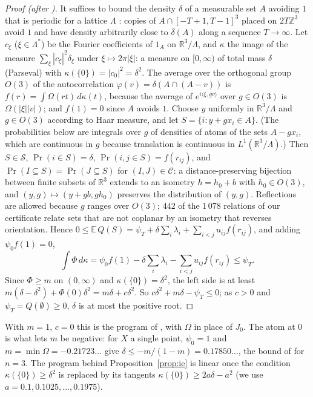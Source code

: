 \documentclass[11pt,a4paper]{amsart}
\theoremstyle{remark}
\newcommand{\R}{\mathbb{R}}
\newcommand{\Z}{\mathbb{Z}}
\newcommand{\E}{\mathbb{E}}
\newcommand{\NCONG}{1\,078}
\newcommand{\NREV}{442}
\begin{document}
\begin{proof}[Proof (after \cite{ACMVZ})]
It suffices to bound the density $\delta$ of a measurable set $A$ avoiding $1$ that is periodic for a lattice
$\Lambda$ \cite[§2]{OFV}: copies of $A\cap[-T+1,T-1]^3$ placed on $2T\Z^3$ avoid $1$ and have density arbitrarily close
to $\overline\delta(A)$ along a sequence $T\to\infty$. Let $c_\xi$ ($\xi\in\Lambda^*$) be the Fourier coefficients of
$1_A$ on $\R^3/\Lambda$, and $\kappa$ the image of the measure $\sum_\xi|c_\xi|^2\delta_\xi$ under $\xi\mapsto2\pi|\xi|$: a
measure on $[0,\infty)$ of total mass $\delta$ (Parseval) with $\kappa(\{0\})=|c_0|^2=\delta^2$. The average over the
orthogonal group $O(3)$ of the autocorrelation $\varphi(v)=\delta(A\cap(A-v))$ is
$f(r)=\int\Omega(rt)\,d\kappa(t)$, because the average of $e^{i\langle\xi,gv\rangle}$ over $g\in O(3)$ is
$\Omega(|\xi||v|)$; and $f(1)=0$ since $A$ avoids $1$. Choose $y$ uniformly in $\R^3/\Lambda$ and $g\in O(3)$ according
to Haar measure, and let $S=\{i:y+gx_i\in A\}$. (The probabilities below are integrals over $g$ of densities of atoms
of the sets $A-gx_i$, which are continuous in $g$ because translation is continuous in $L^1(\R^3/\Lambda)$.) Then
$S\in\mathcal S$, $\Pr(i\in S)=\delta$, $\Pr(i,j\in S)=f(r_{ij})$, and $\Pr(I\subseteq S)=\Pr(J\subseteq S)$ for
$(I,J)\in\mathcal C$: a distance-preserving bijection between finite subsets of $\R^3$ extends to an isometry $h=h_0+b$
with $h_0\in O(3)$, and $(y,g)\mapsto(y+gb,gh_0)$ preserves the distribution of $(y,g)$. Reflections are allowed
because $g$ ranges over $O(3)$; $\NREV$ of the $\NCONG$ relations of our certificate relate sets that are not
coplanar by an isometry that reverses orientation. Hence $0\le\E\,Q(S)=\psi_T+\delta\sum_i\lambda_i+\sum_{i<j}u_{ij}f(r_{ij})$,
and adding $\psi_0f(1)=0$,
\[
\int\Phi\,d\kappa=\psi_0f(1)-\delta\sum_i\lambda_i-\sum_{i<j}u_{ij}f(r_{ij})\le\psi_T.
\]
Since $\Phi\ge m$ on $(0,\infty)$ and $\kappa(\{0\})=\delta^2$, the left side is at least
$m(\delta-\delta^2)+\Phi(0)\delta^2=m\delta+c\delta^2$. So $c\delta^2+m\delta-\psi_T\le0$; as $c>0$ and
$\psi_T=Q(\emptyset)\ge0$, $\delta$ is at most the positive root.
\end{proof}

With $m=1$, $c=0$ this is the program of \cite{ACMVZ}, with $\Omega$ in place of $J_0$. The atom at $0$ is what lets $m$
be negative: for $X$ a single point, $\psi_0=1$ and $m=\min\Omega=-0.21723\ldots$ give $\delta\le-m/(1-m)=0.17850\ldots$,
the bound of \cite[(8)]{OFV} for $n=3$. The program behind Proposition~\ref{prop:ie} is linear once the condition
$\kappa(\{0\})\ge\delta^2$ is replaced by its tangents $\kappa(\{0\})\ge2a\delta-a^2$ (we use $a=0.1,0.1025,\dots,0.1975$).
\end{document}
